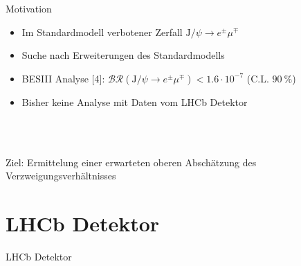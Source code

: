 \begin{frame}[t]{Motivation}
  \begin{itemize}
    \item Im Standardmodell verbotener Zerfall $\text{J}/\psi\rightarrow e^{\pm}\mu^{\mp}$
    \item Suche nach Erweiterungen des Standardmodells
    \item BESIII Analyse [4]: $\mathcal{BR}(\text{J}/\psi\rightarrow e^{\pm}\mu^{\mp})<1.6\cdot 10^{-7}$ (C.L. $\SI{90}{\percent}$)
    \item Bisher keine Analyse mit Daten vom LHCb Detektor
  \end{itemize}
  \ \\
  \ \\
  \begin{framed}
    \centering
    \large{Ziel: Ermittelung einer erwarteten oberen Abschätzung des Verzweigungsverhältnisses}
  \end{framed}
\end{frame}

\section{LHCb Detektor}
\begin{frame}[t]{LHCb Detektor}

\end{frame}
